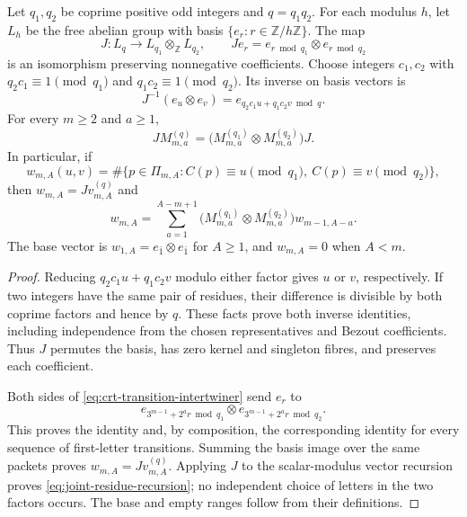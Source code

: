 \begin{theorem}\label{thm:packet-synchronized-crt}
Let $q_1,q_2$ be coprime positive odd integers and $q=q_1q_2$.
For each modulus $h$, let $L_h$ be the free abelian group with basis
$\{e_r:r\in\mathbb Z/h\mathbb Z\}$.  The map
\[
 J:L_q\longrightarrow L_{q_1}\otimes_{\mathbb Z}L_{q_2},\qquad
 Je_r=e_{r\bmod q_1}\otimes e_{r\bmod q_2}
\]
is an isomorphism preserving nonnegative coefficients.  Choose integers
$c_1,c_2$ with $q_2c_1\equiv1\pmod{q_1}$ and
$q_1c_2\equiv1\pmod{q_2}$.  Its inverse on basis vectors is
\[
 J^{-1}(e_u\otimes e_v)=e_{q_2c_1u+q_1c_2v\bmod q}.
\]
For every $m\ge2$ and $a\ge1$,
\begin{equation}\label{eq:crt-transition-intertwiner}
 JM_{m,a}^{(q)}=
 \bigl(M_{m,a}^{(q_1)}\otimes M_{m,a}^{(q_2)}\bigr)J.
\end{equation}
In particular, if
\[
 w_{m,A}(u,v)=\#\{p\in\Pi_{m,A}:
                  C(p)\equiv u\pmod{q_1},\ C(p)\equiv v\pmod{q_2}\},
\]
then $w_{m,A}=Jv_{m,A}^{(q)}$ and
\begin{equation}\label{eq:joint-residue-recursion}
 w_{m,A}=\sum_{a=1}^{A-m+1}
 \bigl(M_{m,a}^{(q_1)}\otimes M_{m,a}^{(q_2)}\bigr)w_{m-1,A-a}.
\end{equation}
The base vector is $w_{1,A}=e_{\bar1}\otimes e_{\bar1}$ for $A\ge1$,
and $w_{m,A}=0$ when $A<m$.
\end{theorem}

\begin{proof}
Reducing $q_2c_1u+q_1c_2v$ modulo either factor gives $u$ or $v$,
respectively.  If two integers have the same pair of residues, their
difference is divisible by both coprime factors and hence by $q$.
These facts prove both inverse identities, including independence from the
chosen representatives and Bezout coefficients.  Thus $J$ permutes the
basis, has zero kernel and singleton fibres, and preserves each coefficient.

Both sides of \eqref{eq:crt-transition-intertwiner} send $e_r$ to
\[
 e_{3^{m-1}+2^ar\bmod q_1}\otimes
 e_{3^{m-1}+2^ar\bmod q_2}.
\]
This proves the identity and, by composition, the corresponding identity
for every sequence of first-letter transitions.  Summing the basis image
over the same packets proves $w_{m,A}=Jv_{m,A}^{(q)}$.  Applying $J$ to
the scalar-modulus vector recursion proves
\eqref{eq:joint-residue-recursion}; no independent choice of letters in the
two factors occurs.  The base and empty ranges follow from their definitions.
\end{proof}

